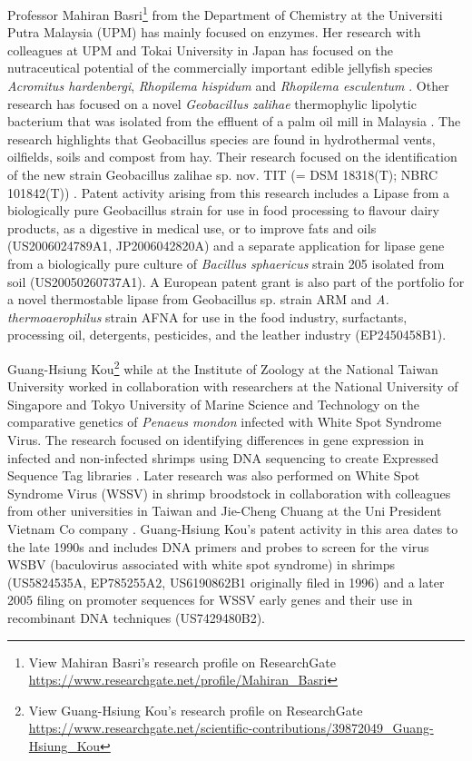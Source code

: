 \documentclass[]{book}
\let\rmarkdownfootnote\footnote%
\def\footnote{\protect\rmarkdownfootnote}
\theoremstyle{definition}
\theoremstyle{definition}
\theoremstyle{definition}
\theoremstyle{remark}
\begin{document}
Professor Mahiran Basri\footnote{View Mahiran Basri's research profile
  on ResearchGate
  \url{https://www.researchgate.net/profile/Mahiran_Basri}} from the
Department of Chemistry at the Universiti Putra Malaysia (UPM) has
mainly focused on enzymes. Her research with colleagues at UPM and Tokai
University in Japan has focused on the nutraceutical potential of the
commercially important edible jellyfish species \emph{Acromitus
hardenbergi}, \emph{Rhopilema hispidum} and \emph{Rhopilema esculentum}
\citep{Khong_2016}. Other research has focused on a novel
\emph{Geobacillus zalihae} thermophylic lipolytic bacterium that was
isolated from the effluent of a palm oil mill in Malaysia
\citep{Rahman_2007}. The research highlights that Geobacillus species
are found in hydrothermal vents, oilfields, soils and compost from hay.
Their research focused on the identification of the new strain
Geobacillus zalihae sp. nov. TIT (= DSM 18318(T); NBRC 101842(T))
\citep{Khong_2016}. Patent activity arising from this research includes
a Lipase from a biologically pure Geobacillus strain for use in food
processing to flavour dairy products, as a digestive in medical use, or
to improve fats and oils (US2006024789A1, JP2006042820A) and a separate
application for lipase gene from a biologically pure culture of
\emph{Bacillus sphaericus} strain 205 isolated from soil
(US20050260737A1). A European patent grant is also part of the portfolio
for a novel thermostable lipase from Geobacillus sp. strain ARM and
\emph{A. thermoaerophilus} strain AFNA for use in the food industry,
surfactants, processing oil, detergents, pesticides, and the leather
industry (EP2450458B1).

Guang-Hsiung Kou\footnote{View Guang-Hsiung Kou's research profile on
  ResearchGate
  \url{https://www.researchgate.net/scientific-contributions/39872049_Guang-Hsiung_Kou}}
while at the Institute of Zoology at the National Taiwan University
worked in collaboration with researchers at the National University of
Singapore and Tokyo University of Marine Science and Technology on the
comparative genetics of \emph{Penaeus mondon} infected with White Spot
Syndrome Virus. The research focused on identifying differences in gene
expression in infected and non-infected shrimps using DNA sequencing to
create Expressed Sequence Tag libraries \citep{Leu_2007}. Later research
was also performed on White Spot Syndrome Virus (WSSV) in shrimp
broodstock in collaboration with colleagues from other universities in
Taiwan and Jie-Cheng Chuang at the Uni President Vietnam Co company
\citep{Chang_2012}. Guang-Hsiung Kou's patent activity in this area
dates to the late 1990s and includes DNA primers and probes to screen
for the virus WSBV (baculovirus associated with white spot syndrome) in
shrimps (US5824535A, EP785255A2, US6190862B1 originally filed in 1996)
and a later 2005 filing on promoter sequences for WSSV early genes and
their use in recombinant DNA techniques (US7429480B2).
\end{document}
